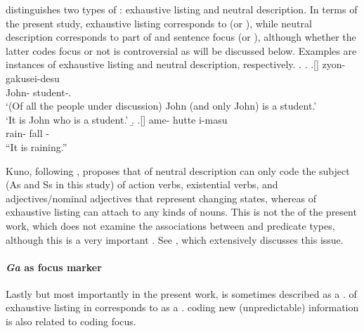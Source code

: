  distinguishes two types of :
exhaustive listing and neutral description.
In terms of the present study,
exhaustive listing corresponds to  (or ),
while neutral description corresponds to part of  and sentence focus (or ),
although whether the latter  codes focus or not is controversial
as will be discussed below.
Examples \Next[a-b] are instances of exhaustive listing and
neutral description, respectively.
%
\ex.
 \a. 
 \bg.[] zyon- gakusei-desu \\
      John- student-. \\
      `(Of all the people under discussion) John (and only John) is a student.' \\
      `It is John who is a student.'
 \b. 
 \bg.[] ame- hutte i-masu \\
      rain- fall - \\
      ``It is raining.''
      \hfill{\cite[38]{kuno73}}

Kuno, following ,
proposes that
 of neutral description can only code
the subject (As and Ss in this study) of action verbs,
existential verbs, and
adjectives/nominal adjectives
that represent changing states,
whereas  of exhaustive listing can attach to any kinds of nouns.
This is not the  of the present work,
which does not examine
the associations between  and predicate types,
although this is a very important .
See ,
which extensively discusses this issue.


\paragraph{\textit{Ga} as focus marker}
Lastly but most importantly in the present work,
 is sometimes described as a .
 of exhaustive listing in  corresponds to
 as a  \cite{heycock08}.
 coding new (unpredictable) information \cite[Chapter 25]{kuno73j} is also related to  coding focus.

